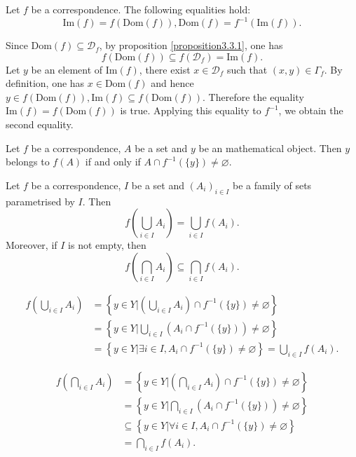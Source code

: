 \begin{propositionenv}\label{proposition3.3.2}
    Let $f$ be a correspondence. The following equalities hold:
    $$\mathrm{Im}(f)=f(\mathrm{Dom}(f)), \mathrm{Dom}(f)=f^{-1}(\mathrm{Im}(f)).$$
\end{propositionenv}
\begin{proofenv}
    Since $\mathrm{Dom}(f)\subseteq\mathscr{D}_f$,  by proposition \ref{proposition3.3.1},  one has 
    $$f(\mathrm{Dom}(f))\subseteq f(\mathscr{D}_f)=\mathrm{Im}(f).$$
    Let $y$ be an element of $\mathrm{Im}(f)$,  there exist $x\in \mathscr{D}_f$ such that $(x, y)\in \Gamma_f$. By definition,  one has $x\in \mathrm{Dom }(f)$ and hence $y\in f(\mathrm{Dom }(f)), \mathrm{Im}(f)\subseteq f(\mathrm{Dom }(f))$. Therefore the equality $\mathrm{Im}(f)=f(\mathrm{Dom}(f))$ is true. Applying this equality to $f^{-1}$,  we obtain the second equality.
\end{proofenv}
\begin{propositionenv}
    Let $f$ be a correspondence,  $A$ be a set and $y$ be an mathematical object. Then $y$ belongs to $f(A)$ if and only if $A\cap f^{-1}(\{y\})\not=\varnothing$.
\end{propositionenv}
\begin{propositionenv}\label{proposition3.3.4}
    Let $f$ be a correspondence,  $I$ be a set and $(A_i)_{i\in I}$ be a family of sets parametrised by $I$. Then
    $$f\left( \bigcup_{i\in I}A_i\right)=\bigcup_{i\in I}f(A_i).$$
    Moreover, if $I$ is not empty,  then 
    $$f\left( \bigcap_{i\in I}A_i\right)\subseteq \bigcap_{i\in I}f(A_i).$$

\end{propositionenv}
\begin{proofenv}
   \begin{align*}
         f\left( \bigcup_{i\in I}A_i\right)&=\left\{ y\in Y|\left( \bigcup_{i\in I}A_i\right)\cap f^{-1}(\{y\})\not=\varnothing  \right\}\\
        &=\left\{ y\in Y|\bigcup_{i\in I}\left(A_i\cap f^{-1}(\{y\})\right)\not=\varnothing  \right\}\\
        &=\left\{y\in Y|\exists i \in I, A_i\cap f^{-1}(\{y\})\not =\varnothing\right\}=\bigcup_{i\in I}f(A_i).
   \end{align*}

    \begin{align*}
        f\left(\bigcap_{i\in I}A_i \right)&=\left\{ y\in Y|\left( \bigcap_{i\in I}A_i\right) \cap f^{-1}(\{y\})\not=\varnothing\right\}\\
        &=\left\{ y\in Y| \bigcap_{i\in I}\left(A_i \cap f^{-1}(\{y\})\right)\not=\varnothing\right\}\\
        &\subseteq \left\{  y\in Y|\forall i\in I,  A_i\cap f^{-1}(\{y\})\not=\varnothing\right\}\\
        &=\bigcap_{i\in I}f(A_i).
    \end{align*}
\end{proofenv}
